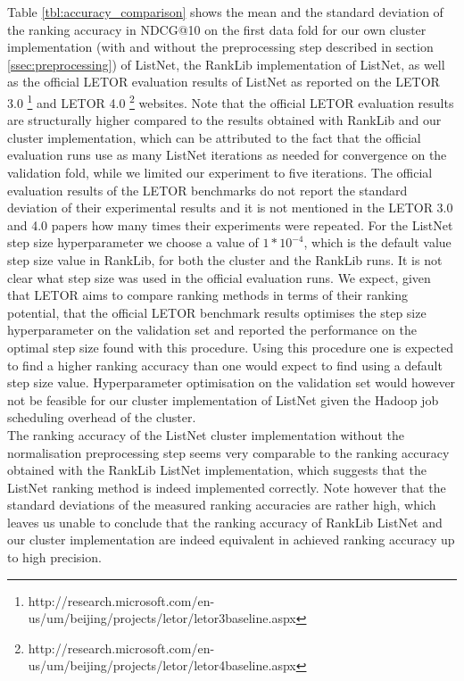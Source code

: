 Table \ref{tbl:accuracy_comparison} shows the mean and the standard deviation of the ranking accuracy in \ac{NDCG}@10 on the first data fold for our own cluster implementation (with and without the preprocessing step described in section \ref{ssec:preprocessing}) of ListNet, the RankLib implementation of ListNet, as well as the official LETOR evaluation results of ListNet as reported on the LETOR 3.0 \footnote{http://research.microsoft.com/en-us/um/beijing/projects/letor/letor3baseline.aspx} and LETOR 4.0 \footnote{http://research.microsoft.com/en-us/um/beijing/projects/letor/letor4baseline.aspx} websites. Note that the official LETOR evaluation results are structurally higher compared to the results obtained with RankLib and our cluster implementation, which can be attributed to the fact that the official evaluation runs use as many ListNet iterations as needed for convergence on the validation fold, while we limited our experiment to five iterations. The official evaluation results of the LETOR benchmarks do not report the standard deviation of their experimental results and it is not mentioned in the LETOR 3.0 and 4.0 papers \cite{Qin2010, Qin2013} how many times their experiments were repeated. For the ListNet step size hyperparameter we choose a value of $1*10^{-4}$, which is the default value step size value in RankLib, for both the cluster and the RankLib runs. It is not clear what step size was used in the official evaluation runs. We expect, given that LETOR aims to compare ranking methods in terms of their ranking potential, that the official LETOR benchmark results optimises the step size hyperparameter on the validation set and reported the performance on the optimal step size found with this procedure. Using this procedure one is expected to find a higher ranking accuracy than one would expect to find using a default step size value. Hyperparameter optimisation on the validation set would however not be feasible for our cluster implementation of ListNet given the Hadoop job scheduling overhead of the cluster.\\

The ranking accuracy of the ListNet cluster implementation without the normalisation preprocessing step seems very comparable to the ranking accuracy obtained with the RankLib ListNet implementation, which suggests that the ListNet ranking method is indeed implemented correctly. Note however that the standard deviations of the measured ranking accuracies are rather high, which leaves us unable to conclude that the ranking accuracy of RankLib ListNet and our cluster implementation are indeed equivalent in achieved ranking accuracy up to high precision.\\

